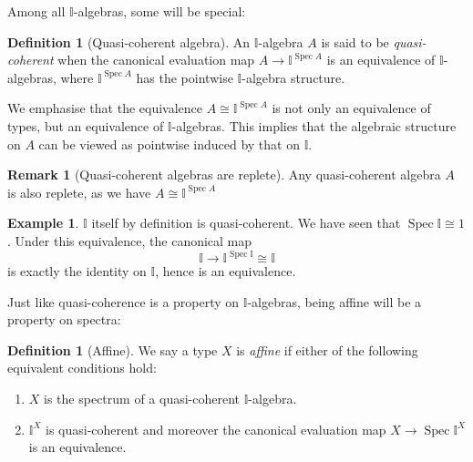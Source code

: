\documentclass[12pt]{amsart}
\newtheorem{lemma}[theorem]{Lemma}
\theoremstyle{definition}
\newtheorem{example}[theorem]{Example}
\newtheorem{definition}[theorem]{Definition}
\newtheorem{remark}[theorem]{Remark}
\newcommand{\mbb}[1]{\mathbb{#1}}
\newcommand{\I}{\mbb I}
\newcommand{\fa}[2]{\forall #1\!\colon\!\!#2\mathpunct{.}}
\newcommand{\eq}{\leftrightarrow}
\newcommand{\spec}{\operatorname{Spec}}
\begin{document}
Among all $\I$-algebras, some will be special:

\begin{definition}[Quasi-coherent algebra]
  An $\I$-algebra $A$ is said to be \emph{quasi-coherent} when the canonical evaluation map $A \to \I^{\spec A}$ is an equivalence of $\I$-algebras, where $\I^{\spec A}$ has the pointwise $\I$-algebra structure.
\end{definition}

We emphasise that the equivalence $A \cong \I^{\spec A}$ is not only an equivalence of types, but an equivalence of $\I$-algebras. This implies that the algebraic structure on $A$ can be viewed as pointwise induced by that on $\I$. 



\begin{remark}[Quasi-coherent algebras are replete]\label{rem:qcreplete}
  Any quasi-coherent algebra $A$ is also replete, as we have $A\cong \I^{\spec{A}}$
\end{remark}

\begin{example}\label{exm:intervalqc}
  $\I$ itself by definition is quasi-coherent. We have seen that $\spec \I \cong 1$. Under this equivalence, the canonical map 
  \[ \I \to \I^{\spec \I} \cong \I \]
  is exactly the identity on $\I$, hence is an equivalence.
\end{example}

Just like quasi-coherence is a property on $\I$-algebras, being affine will be a property on spectra:

\begin{definition}[Affine]
  We say a type $X$ is \emph{affine} if either of the following equivalent conditions hold:
  \begin{enumerate}
    \item $X$ is the spectrum of a quasi-coherent $\I$-algebra.
    \item $\I^X$ is quasi-coherent and moreover the canonical evaluation map $X \to \spec \I^X$ is an equivalence.
  \end{enumerate}
\end{definition}
\end{document}
